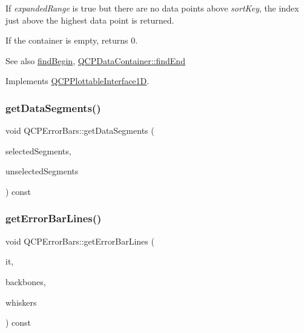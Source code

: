 If {\itshape expanded\+Range} is true but there are no data points above {\itshape sort\+Key}, the index just above the highest data point is returned.

If the container is empty, returns 0.

\begin{DoxySeeAlso}{See also}
\mbox{\hyperlink{class_q_c_p_error_bars_a74c57d6abb8eda3c4c31b72d1df9f568}{find\+Begin}}, \mbox{\hyperlink{class_q_c_p_data_container_afb8b8f23cc2b7234a793a25ce79fe48f}{Q\+C\+P\+Data\+Container\+::find\+End}} 
\end{DoxySeeAlso}


Implements \mbox{\hyperlink{class_q_c_p_plottable_interface1_d_a5deced1016bc55a41a2339619045b295}{Q\+C\+P\+Plottable\+Interface1D}}.

\mbox{\label{class_q_c_p_error_bars_a243e0bb2563fc2e9f08efd77e7175abf}} 
\subsubsection{\texorpdfstring{getDataSegments()}{getDataSegments()}}
{\footnotesize\ttfamily void Q\+C\+P\+Error\+Bars\+::get\+Data\+Segments (\begin{DoxyParamCaption}\item[{Q\+List$<$ \mbox{\hyperlink{class_q_c_p_data_range}{Q\+C\+P\+Data\+Range}} $>$ \&}]{selected\+Segments,  }\item[{Q\+List$<$ \mbox{\hyperlink{class_q_c_p_data_range}{Q\+C\+P\+Data\+Range}} $>$ \&}]{unselected\+Segments }\end{DoxyParamCaption}) const\hspace{0.3cm}{\ttfamily [protected]}}

\mbox{\label{class_q_c_p_error_bars_abeea5ff0d66732bbfc9b74869d8c552e}} 
\subsubsection{\texorpdfstring{getErrorBarLines()}{getErrorBarLines()}}
{\footnotesize\ttfamily void Q\+C\+P\+Error\+Bars\+::get\+Error\+Bar\+Lines (\begin{DoxyParamCaption}\item[{Q\+C\+P\+Error\+Bars\+Data\+Container\+::const\+\_\+iterator}]{it,  }\item[{Q\+Vector$<$ Q\+LineF $>$ \&}]{backbones,  }\item[{Q\+Vector$<$ Q\+LineF $>$ \&}]{whiskers }\end{DoxyParamCaption}) const\hspace{0.3cm}{\ttfamily [protected]}}

